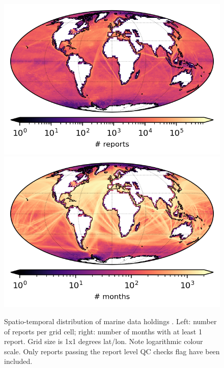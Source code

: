 \begin{figure}[h]
\includegraphics{resources/header-reports-map-optimal.png}
\includegraphics{resources/header-months-map-optimal.png}
\caption{Spatio-temporal distribution of marine data holdings \datatimerange{}. Left: number of reports per grid cell; right: number of months with at least 1 report. Grid size is 1x1 degrees lat/lon. Note logarithmic colour scale. Only reports passing the report level QC checks flag have been included.\\}
\label{fig:nreports-map1}
\end{figure}

\newpage
